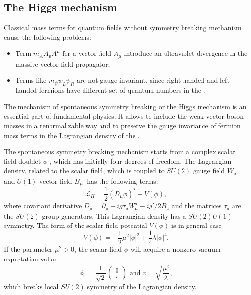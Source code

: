 \subsection{The Higgs mechanism}
\label{sec:Higgs_SM}
Classical mass terms for quantum fields without symmetry breaking mechanism cause the following problems:
\begin{itemize}
	\item Term $m_A A_\mu A^\mu$ for a vector field $A_\mu$ introduce an ultraviolet divergence in the massive vector field propagator;
	\item Terms like $m_\psi\psi_L \psi_R$ are not gauge-invariant, since right-handed and left-handed fermions have different set of quantum numbers in the \sm.
\end{itemize}
The mechanism of spontaneous symmetry breaking or the Higgs mechanism is an essential part of fundamental physics. 
It allows to include the weak vector boson masses in a renormalizable way and to  preserve the gauge invariance of fermion mass terms in the Lagrangian density of the \sm. 

The spontaneous symmetry breaking mechanism starts from a complex scalar field doublet $\phi$ , which has initially four degrees of freedom. 
The Lagrangian density, related to the scalar field, which is coupled to $SU(2)$ gauge field $W_\mu$ and $U(1)$ vector field $B_\mu$, has the following terms: 
\begin{equation}
	\mathcal{L}_{H} = \frac{1}{2}(D_\mu\phi)^2 - V(\phi),
    \label{formula:scalarLagrangian_1}
\end{equation}
where covariant derivative $D_\mu = \partial_\mu - i g \tau_a W^a_\mu - ig'/2 B_\mu$ and the matrices $\tau_a$ are the $SU(2)$ group generators. This Lagrangian density has a $SU(2) U(1)$ symmetry.
The form of the scalar field potential $V(\phi)$ is in general case 
\begin{equation}
    V(\phi) = -\frac{1}{2}\mu^2|\phi|^2 +  \frac{1}{4} \lambda |\phi|^4.
\end{equation}
If the parameter $\mu^2 > 0$, the scalar field $\phi$ will acquire a nonzero vacuum expectation value  %
\begin{equation}
\phi_0 = \frac{1}{\sqrt{2}}
\begin{pmatrix}
0\\v
\end{pmatrix} \text{ and } v = \sqrt{\frac{\mu^2}{\lambda}}, 
\end{equation}
which breaks local $SU(2)$ symmetry of the Lagrangian density. 

